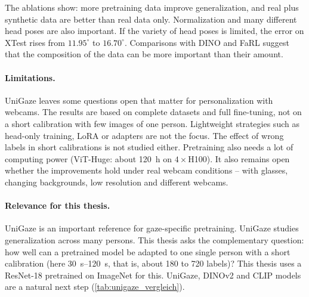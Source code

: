 The ablations show: more pretraining data improve generalization, and real plus
synthetic data are better than real data only. Normalization and many
different head poses are also important. If the variety of head poses is
limited, the error on XTest rises from $11.95^\circ$ to $16.70^\circ$.
Comparisons with DINO and FaRL suggest that the composition of the data can be
more important than their amount.

\paragraph{Limitations.}
UniGaze leaves some questions open that matter for personalization with
webcams. The results are based on complete datasets and full fine-tuning, not
on a short calibration with few images of one person. Lightweight strategies
such as head-only training, LoRA or adapters are not the focus. The effect of
wrong labels in short calibrations is not studied either. Pretraining also
needs a lot of computing power (ViT-Huge: about \SI{120}{\hour} on
$4\times$H100). It also remains open whether the improvements hold under real
webcam conditions -- with glasses, changing backgrounds, low resolution and
different webcams.

\paragraph{Relevance for this thesis.}
UniGaze is an important reference for gaze-specific pretraining. UniGaze
studies generalization across many persons. This thesis asks the complementary
question: how well can a pretrained model be adapted to one single person with
a short calibration (here \SIrange{30}{120}{\second}, that is, about 180 to
720 labels)? This thesis uses a ResNet-18 pretrained on ImageNet for this.
UniGaze, DINOv2 and CLIP models are a natural next step
(\cref{tab:unigaze_vergleich}).

